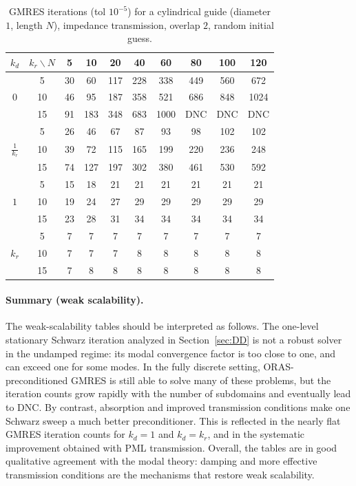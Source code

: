 \documentclass[smallextended]{svjour3}       %
\begin{document}
\begin{table}[h]
\centering
\setlength{\tabcolsep}{3pt}
\renewcommand{\arraystretch}{1.05}
\caption{GMRES iterations (tol \(10^{-5}\)) for a cylindrical guide (diameter \(1\), length \(N\)),
impedance transmission, overlap \(2\), random initial guess.}
\label{tab:weak-imp-cyl}
\begin{tabular}{|c||c|c|c|c|c|c|c|c|c|}
\hline
$k_d$ & $ k_r \backslash N$ & 5 & 10 & 20 & 40 & 60 & 80 & 100 & 120 \\
\hline
 & 5 & 30 & 60 & 117 & 228 & 338 & 449 & 560 & 672 \\
$0$ & 10 & 46 & 95 & 187 & 358 & 521 & 686 & 848 & 1024 \\
 & 15 & 91 & 183 & 348 & 683 & 1000 & DNC & DNC & DNC \\
\hline\hline
 & 5 & 26 & 46 & 67 & 87 & 93 & 98 & 102 & 102 \\
$\frac{1}{k_r}$ & 10 & 39 & 72 & 115 & 165 & 199 & 220 & 236 & 248 \\
 & 15 & 74 & 127 & 197 & 302 & 380 & 461 & 530 & 592 \\
\hline\hline
 & 5 & 15 & 18 & 21 & 21 & 21 & 21 & 21 & 21 \\
$1$ & 10 & 19 & 24 & 27 & 29 & 29 & 29 & 29 & 29 \\
 & 15 & 23 & 28 & 31 & 34 & 34 & 34 & 34 & 34 \\
\hline\hline
 & 5 & 7 & 7 & 7 & 7 & 7 & 7 & 7 & 7 \\
$k_r$ & 10 & 7 & 7 & 7 & 8 & 8 & 8 & 8 & 8 \\
 & 15 & 7 & 8 & 8 & 8 & 8 & 8 & 8 & 8 \\
\hline
\end{tabular}
\end{table}

\paragraph{Summary (weak scalability).}
The weak-scalability tables should be interpreted as follows. The one-level stationary Schwarz
iteration analyzed in Section~\ref{sec:DD} is not a robust solver in the undamped regime: its
modal convergence factor is too close to one, and can exceed one for some modes. In the fully
discrete setting, ORAS-preconditioned GMRES is still able to solve many of these problems, but the
iteration counts grow rapidly with the number of subdomains and eventually lead to
\textsf{DNC}. By contrast, absorption and improved transmission conditions make one Schwarz sweep a
much better preconditioner. This is reflected in the nearly flat GMRES iteration counts for \(k_d=1\) and
\(k_d=k_r\), and in the systematic improvement obtained with PML transmission. Overall, the
tables are in good qualitative agreement with the modal theory: damping and more effective
transmission conditions are the mechanisms that restore weak scalability.
\end{document}
